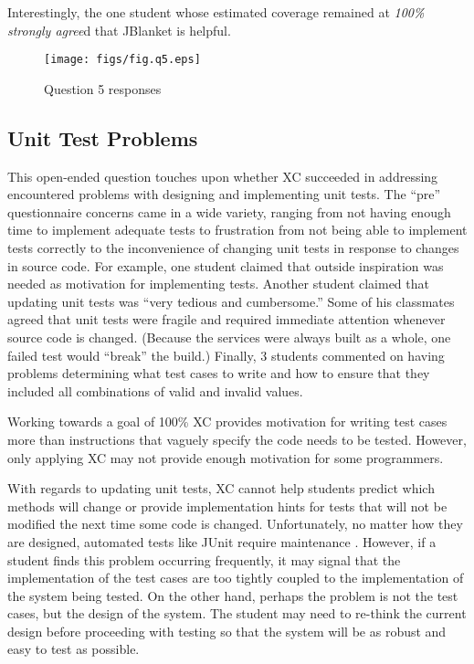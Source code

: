 Interestingly, the one student whose estimated coverage remained at {\sl
100\%} {\sl strongly agree}d that JBlanket is helpful.

\begin{figure}[htbp]
  \centering
  \texttt{[image: figs/fig.q5.eps]}
  \caption{Question 5 responses}
  \label{fig:q5}
\end{figure}

\subsection{Unit Test Problems}
This open-ended question touches upon whether XC succeeded in addressing
encountered problems with designing and implementing unit tests.  The
``pre'' questionnaire concerns came in a wide variety, ranging from not
having enough time to implement adequate tests to frustration from not
being able to implement tests correctly to the inconvenience of changing
unit tests in response to changes in source code.  For example, one student
claimed that outside inspiration was needed as motivation for implementing
tests.  Another student claimed that updating unit tests was ``very tedious
and cumbersome.''  Some of his classmates agreed that unit tests were
fragile and required immediate attention whenever source code is changed.
(Because the services were always built as a whole, one failed test would
``break'' the build.)  Finally, 3 students commented on having problems
determining what test cases to write and how to ensure that they included
all combinations of valid and invalid values.

Working towards a goal of 100\% XC provides motivation for writing test
cases more than instructions that vaguely specify the code needs to be
tested. However, only applying XC may not provide enough motivation for
some programmers.

With regards to updating unit tests, XC cannot help students predict which
methods will change or provide implementation hints for tests that will not
be modified the next time some code is changed.  Unfortunately, no matter
how they are designed, automated tests like JUnit require maintenance
\cite{Hoffman:1999}.  However, if a student finds this problem occurring
frequently, it may signal that the implementation of the test cases are too
tightly coupled to the implementation of the system being tested.  On the
other hand, perhaps the problem is not the test cases, but the design of
the system.  The student may need to re-think the current design before
proceeding with testing so that the system will be as robust and easy to
test as possible.

